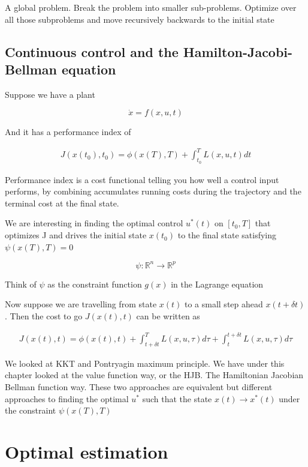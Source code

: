 \documentclass[11pt, a4paper]{article} %
\begin{document}
A global problem. Break the problem into smaller sub-problems. Optimize over all those subproblems and move recursively backwards to the initial state


\subsection{Continuous control and the Hamilton-Jacobi-Bellman equation}

Suppose we have a plant 

\[
    \dot{x} = f(x, u, t)
\]

And it has a performance index of 

\begin{align*}
    J(x(t_0), t_0) = \phi(x(T), T) + \int_{t_0}^{T}L(x, u, t) dt
\end{align*}

Performance index is a cost functional telling you how well a control input performs, by combining accumulates running costs during the trajectory and the terminal cost at the final state. 


We are interesting in finding the optimal control $ u^*(t) $ on $ \left[ t_0, T \right]  $  that optimizes J and drives the initial state $ x(t_0) $ to the final state satisfying $ \psi(x(T),T) = 0 $  


\[
    \psi: \mathbb{R}^n \rightarrow \mathbb{R}^p
\]

Think of $ \psi $ as the constraint function $ g(x) $ in the Lagrange equation  



Now suppose we are travelling from state $x(t)$ to a small step ahead $x(t+\delta t)$. Then the cost to go $ J(x(t), t) $ can be written as 

\begin{align*}
    J(x(t), t) = \phi(x(t), t) + \int_{t+\delta t}^{T} L(x, u, \tau) d\tau + \int_{t}^{t+ \delta t} L(x, u, \tau) d\tau
\end{align*}

We looked at KKT and Pontryagin maximum principle. We have under this chapter looked at the value function way, or the HJB. The Hamiltonian Jacobian Bellman function way. These two approaches are equivalent but different approaches to finding the optimal $ u^* $ such that the state $ x(t) \rightarrow x^*(t) $ under the constraint $ \psi(x(T), T) $ 



\section{Optimal estimation}
\end{document}
